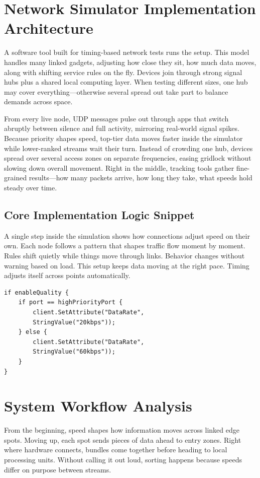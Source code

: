 \documentclass[a4paper,fleqn]{cas-dc}
\numberwithin{equation}{section}
\begin{document}
\section{Network Simulator Implementation Architecture}

A software tool built for timing-based network tests runs the setup. This model handles many linked gadgets, adjusting how close they sit, how much data moves, along with shifting service rules on the fly. Devices join through strong signal hubs plus a shared local computing layer. When testing different sizes, one hub may cover everything—otherwise several spread out take part to balance demands across space.

From every live node, UDP messages pulse out through apps that switch abruptly between silence and full activity, mirroring real-world signal spikes. Because priority shapes speed, top-tier data moves faster inside the simulator while lower-ranked streams wait their turn. Instead of crowding one hub, devices spread over several access zones on separate frequencies, easing gridlock without slowing down overall movement. Right in the middle, tracking tools gather fine-grained results—how many packets arrive, how long they take, what speeds hold steady over time.

\subsection{Core Implementation Logic Snippet}

A single step inside the simulation shows how connections adjust speed on their own. Each node follows a pattern that shapes traffic flow moment by moment. Rules shift quietly while things move through links. Behavior changes without warning based on load. This setup keeps data moving at the right pace. Timing adjusts itself across points automatically.

\begin{verbatim}
if enableQuality {
    if port == highPriorityPort {
        client.SetAttribute("DataRate", 
        StringValue("20kbps"));
    } else {
        client.SetAttribute("DataRate", 
        StringValue("60kbps"));
    }
}
\end{verbatim}

\section{System Workflow Analysis}

From the beginning, speed shapes how information moves across linked edge spots. Moving up, each spot sends pieces of data ahead to entry zones. Right where hardware connects, bundles come together before heading to local processing units. Without calling it out loud, sorting happens because speeds differ on purpose between streams.
\end{document}
